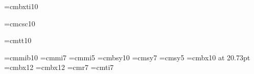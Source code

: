 \documentclass{article}
\begin{document}
\parindent=-8mm\leftskip=8mm
\def\new{\par\hskip 8.3mm}
\def\sect{\par\quad}
\hsize=147mm  \vsize=230mm
\hoffset=-10mm\voffset=0mm

\everymath{\displaystyle}       %

\font\itbf=cmbxti10

\let\dis=\displaystyle          %
\let\eps=\varepsilon            %
\let\vs=\vskip                  %


\frenchspacing

\let\ie=\leq
\let\se=\geq



\font\pc=cmcsc10 %

\def\tp{\raise .2em\hbox{${}^{\hbox{\seveni t}}\!$}}%



\font\info=cmtt10




\font\tenbi=cmmib10 %
\font\sevenbi=cmmi7%
\font\fivebi=cmmi5 %
\font\tenbsy=cmbsy10 %
\font\sevenbsy=cmsy7%
\font\fivebsy=cmsy5%
\font\titlefont=cmbx10 at 20.73pt
\font\chapfont=cmbx12
\font\secfont=cmbx12
\font\headfont=cmr7
\font\itheadfont=cmti7%



\def\euler{\cal}
\def\goth{\cal}
\def\phi{\varphi}
\def\epsilon{\varepsilon}

%

\def\variations#1{\par\medskip\centerline{\vbox{{\offinterlineskip
            \def\decroit{\searrow}
    \def\croit{\nearrow}
    \def\nondef{\parallel}
    \def\tableskip{\omit& height 4pt & \omit \endline}
            \def\cr{\endline\tableskip\noalign{\hrule}\tableskip}
    \halign{
             \tabskip=.7em plus 1em
             \hfil\strut $##$\hfil &\vrule ##
              && \hfil $##$ \hfil \endline
              #1\crcr
           }
 }}}\medskip}   
\end{document}
